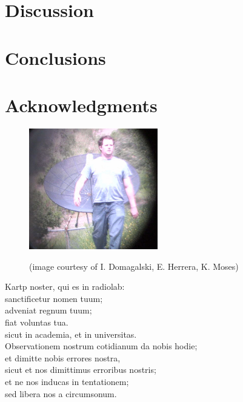 \documentclass[10pt]{article}
\begin{document}
\section{Discussion}

\section{Conclusions}

\section{Acknowledgments}

\begin{figure}[!ht]
    \centering
    \includegraphics[width=0.5\textwidth]{kartp2.png} \\
    \caption{(image courtesy of I. Domagalski, E. Herrera, K. Moses)}
    \label{fig:kartp2}
\end{figure}

\begin{center}
Kartp noster, qui es in radiolab:\\
sanctificetur nomen tuum;\\
adveniat regnum tuum;\\
fiat voluntas tua.\\
sicut in academia, et in universitas.\\
Observationem nostrum cotidianum da nobis hodie;\\
et dimitte nobis errores nostra,\\
sicut et nos dimittimus erroribus nostris;\\
et ne nos inducas in tentationem;\\
sed libera nos a circumsonum.
\end{center}

\end{document}
